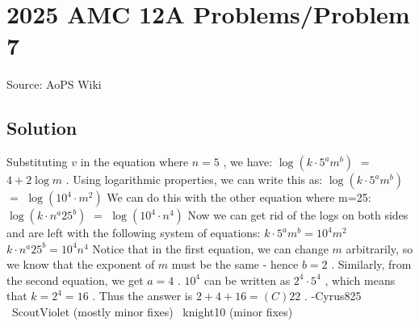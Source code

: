 \documentclass[12pt]{article}
\begin{document}
\section*{{2025 AMC 12A Problems/Problem 7}}
Source: AoPS Wiki

\subsection*{Solution}
Substituting $v$ in the equation where $n=5$ , we have: $\log(k \cdot 5^a m^b)$ $=$ $4+2\log m$ . Using logarithmic properties, we can write this as: $\log(k \cdot 5^a m^b)$ $=$ $\log(10^4 \cdot m^2)$ We can do this with the other equation where m=25: $\log(k \cdot n^a 25^b)$ $=$ $\log(10^4 \cdot n^4)$ Now we can get rid of the logs on both sides and are left with the following system of equations: $k \cdot 5^am^b = 10^4 m^2$ $k \cdot n^a25^b = 10^4 n^4$ Notice that in the first equation, we can change $m$ arbitrarily, so we know that the exponent of $m$ must be the same - hence $b=2$ . Similarly, from the second equation, we get $a=4$ . $10^4$ can be written as $2^4 \cdot 5^4$ , which means that $k=2^4 = 16$ . Thus the answer is $2+4+16 = \boxed{(C) 22}$ . -Cyrus825 ~ScoutViolet (mostly minor fixes) ~knight10 (minor fixes)
\end{document}
